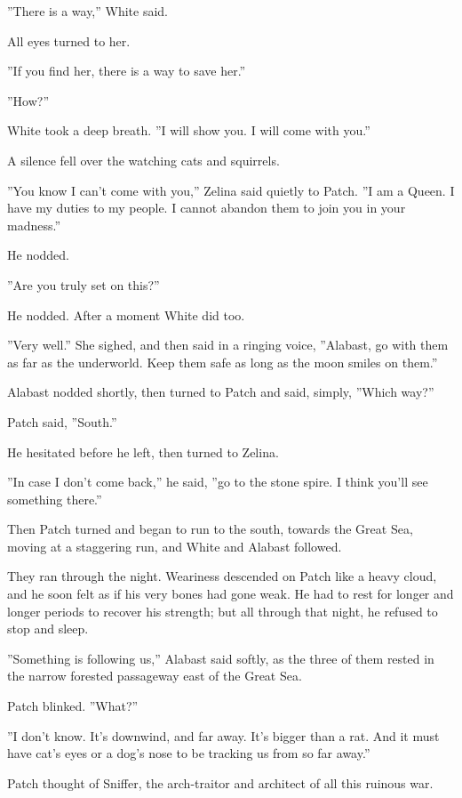 \documentclass[11pt]{article}
\begin{document}
 ''There is a way,'' White said.\par
 All eyes turned to her.\par
 ''If you find her, there is a way to save her.''\par
 ''How?''\par
 White took a deep breath. ''I will show you. I will come with you.''\par
 A silence fell over the watching cats and squirrels.\par
 ''You know I can't come with you,'' Zelina said quietly to Patch. ''I am a Queen. I have my duties to my people. I cannot abandon them to join you in your madness.''\par
 He nodded.\par
 ''Are you truly set on this?''\par
 He nodded. After a moment White did too.\par
 ''Very well.'' She sighed, and then said in a ringing voice, ''Alabast, go with them as far as the underworld. Keep them safe as long as the moon smiles on them.''\par
 Alabast nodded shortly, then turned to Patch and said, simply, ''Which way?''\par
 Patch said, ''South.''\par
 He hesitated before he left, then turned to Zelina.\par
 ''In case I don't come back,'' he said, ''go to the stone spire. I think you'll see something there.''\par
 Then Patch turned and began to run to the south, towards the Great Sea, moving at a staggering run, and White and Alabast followed.\par
They ran through the night. Weariness descended on Patch like a heavy cloud, and he soon felt as if his very bones had gone weak. He had to rest for longer and longer periods to recover his strength; but all through that night, he refused to stop and sleep.\par
 ''Something is following us,'' Alabast said softly, as the three of them rested in the narrow forested passageway east of the Great Sea.\par
 Patch blinked. ''What?''\par
 ''I don't know. It's downwind, and far away. It's bigger than a rat. And it must have cat's eyes or a dog's nose to be tracking us from so far away.''\par
 Patch thought of Sniffer, the arch-traitor and architect of all this ruinous war.\par
\end{document}
